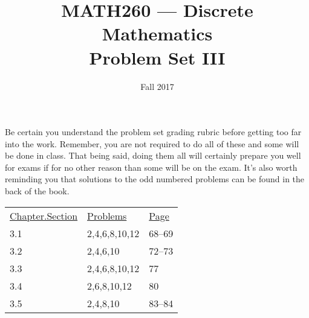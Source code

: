 \documentclass[nobib]{tufte-handout}
\title{MATH260 --- Discrete Mathematics \\  Problem Set III}
\date{Fall 2017}
\begin{document}
\maketitle

Be certain you understand the problem set grading rubric before getting too far into the work.  Remember, you are not required to do all of these and some will be done in class. That being said, doing them all will certainly prepare you well for exams if for no other reason than some will be on the exam. It's also worth reminding you that solutions to the odd numbered problems can be found in the back of the book.

\vspace{.25in}
\begin{tabular}{lll}
\underline{Chapter.Section} & \underline{Problems} & \underline{Page} \\
3.1 & 2,4,6,8,10,12 & 68--69  \\
3.2 & 2,4,6,10 & 72--73 \\
3.3 & 2,4,6,8,10,12 & 77 \\
3.4 & 2,6,8,10,12 & 80 \\
3.5 & 2,4,8,10 & 83--84 \\
\end{tabular}
\end{document}
